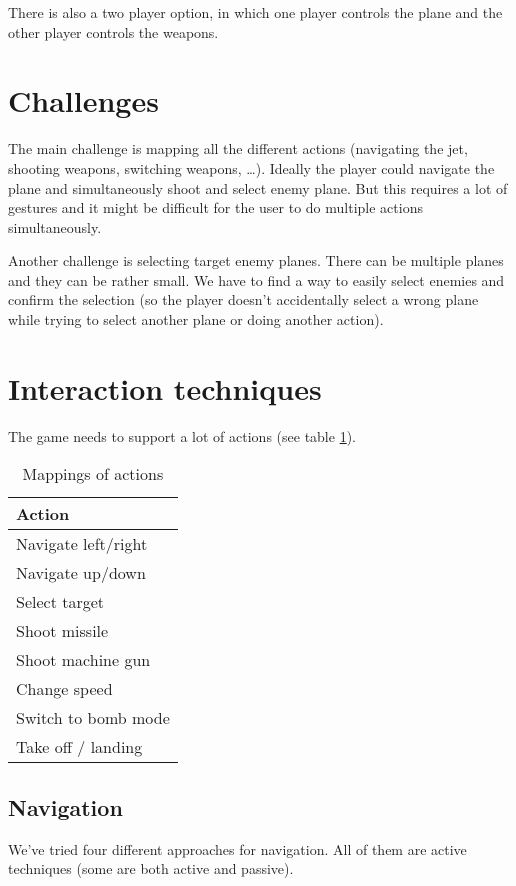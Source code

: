 \documentclass{acm_proc_article-sp}
\begin{document}
There is also a two player option, in which one player controls the plane and the other player controls the weapons.

\section {Challenges}
The main challenge is mapping all the different actions (navigating the jet, shooting weapons, switching weapons, \dots). Ideally the player could navigate the plane and simultaneously shoot and select enemy plane. But this requires a lot of gestures and it might be difficult for the user to do multiple actions simultaneously.

Another challenge is selecting target enemy planes. There can be multiple planes and they can be rather small. We have to find a way to easily select enemies and confirm the selection (so the player doesn't accidentally select a wrong plane while trying to select another plane or doing another action).

\section {Interaction techniques}
The game needs to support a lot of actions (see table \ref{tblActions}).

\begin{table}
\centering
\caption{Mappings of actions}
\begin{tabular}{|l|} \hline
\bf{Action} \\ \hline
Navigate left/right\\ \hline
Navigate up/down\\ \hline
Select target \\ \hline
Shoot missile \\ \hline
Shoot machine gun \\ \hline
Change speed \\ \hline
Switch to bomb mode \\ \hline
Take off / landing \\ \hline
\end{tabular}
\label{tblActions}
\end{table}

\subsection{Navigation}
We've tried four different approaches for navigation. All of them are active techniques (some are both active and passive).
\end{document}
